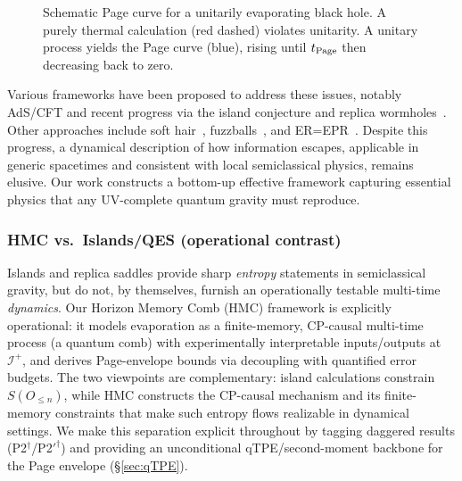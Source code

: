 \documentclass[11pt,a4paper]{article}
\theoremstyle{plain}
\theoremstyle{definition}
\theoremstyle{remark}
\begin{document}
\begin{figure}[htbp]
    \centering
    \caption{Schematic Page curve for a unitarily evaporating black hole. A purely thermal calculation (red dashed) violates unitarity. A unitary process yields the Page curve (blue), rising until $t_{\rm Page}$ then decreasing back to zero.}
    \label{fig:page_curve_intro}
\end{figure}

Various frameworks have been proposed to address these issues, notably AdS/CFT and recent progress via the island conjecture and replica wormholes~\cite{Penington:2020, Almheiri:2020, Chen:2020, Engelhardt:2015}. Other approaches include soft hair~\cite{HPS:2016}, fuzzballs~\cite{Mathur:2005b}, and ER=EPR~\cite{Maldacena:2013}. Despite this progress, a dynamical description of how information escapes, applicable in generic spacetimes and consistent with local semiclassical physics, remains elusive. Our work constructs a bottom-up effective framework capturing essential physics that any UV-complete quantum gravity must reproduce.

\subsubsection{HMC vs.\ Islands/QES (operational contrast)}
Islands and replica saddles provide sharp \emph{entropy} statements in semiclassical gravity,
but do not, by themselves, furnish an operationally testable multi-time \emph{dynamics}.
Our Horizon Memory Comb (HMC) framework is explicitly operational: it models evaporation
as a finite-memory, CP-causal multi-time process (a quantum comb) with experimentally
interpretable inputs/outputs at $\mathcal{I}^+$, and derives Page-envelope bounds via
decoupling with quantified error budgets. The two viewpoints are complementary: island
calculations constrain $S(O_{\le n})$, while HMC constructs the CP-causal mechanism and
its finite-memory constraints that make such entropy flows realizable in dynamical settings.
We make this separation explicit throughout by tagging daggered results (P2$^\dagger$/P2$'^{\dagger}$)
and providing an unconditional qTPE/second-moment backbone for the Page envelope
(\S\ref{sec:qTPE}).
\end{document}
